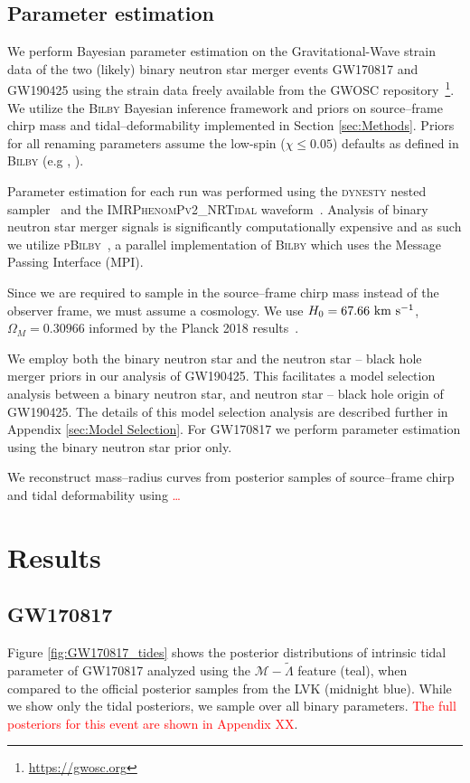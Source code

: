 \documentclass[twocolumn]{aastex631}
\newcommand{\red}[1]{\textcolor{red}{#1}}
\begin{document}
	\subsection{Parameter estimation}
	We perform Bayesian parameter estimation on the Gravitational-Wave strain data of the two (likely) binary neutron star merger events GW170817 and GW190425 using the strain data freely available from the GWOSC repository~\footnote{\url{https://gwosc.org}}. 
	We utilize the \textsc{Bilby} Bayesian inference framework and priors on source--frame chirp mass and tidal--deformability implemented in Section \ref{sec:Methods}. Priors for all renaming parameters assume the low-spin ($\chi \leq 0.05$) defaults as defined in \textsc{Bilby} (e.g \citealt{ashton19}, \citealt{romeroshaw20}).
	
	Parameter estimation for each run was performed using the \textsc{dynesty} nested sampler~\citep{Dynesty} and the \textsc{IMRPhenomPv2\_NRTidal} waveform~\citep{IMRPhenomP_NRtidal}. Analysis of binary neutron star merger signals is significantly computationally expensive and as such we utilize \textsc{pBilby}~\citep{pbilby}, a parallel implementation of \textsc{Bilby} which uses the Message Passing Interface (MPI). 
	
	Since we are required to sample in the source--frame chirp mass instead of the observer frame, we must assume a cosmology. We use $H_0=67.66 \rm  \ km  \ s^{-1}$, $\Omega_M = 0.30966 $ informed by the Planck 2018 results~\citep{Planck}.  
	
	We employ both the binary neutron star and the neutron star -- black hole merger priors in our analysis of GW190425. This facilitates a model selection analysis between a binary neutron star, and neutron star -- black hole origin of GW190425. The details of this model selection analysis are described further in Appendix \ref{sec:Model Selection}. 
	For GW170817 we perform parameter estimation using the binary neutron star prior only. 
	
	We reconstruct mass--radius curves from posterior samples of source--frame chirp and tidal deformability using \red{\ldots}
	
	
	\section{Results} \label{sec:Results}
	
	
	\subsection{GW170817}
	Figure \ref{fig:GW170817_tides} shows the posterior distributions of intrinsic tidal parameter of GW170817 analyzed using the $\mathcal{M}-\tilde{\Lambda}$ feature (teal), when compared to the official posterior samples from the LVK (midnight blue). While we show only the tidal posteriors, we sample over all binary parameters. \red{The full posteriors for this event are shown in Appendix XX}. 
	
\end{document}
